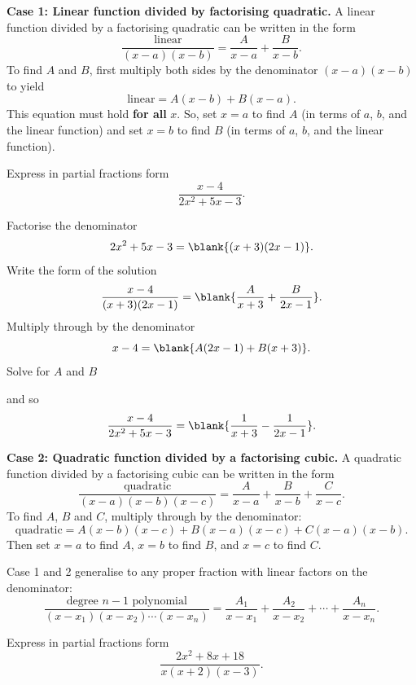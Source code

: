 \textbf{Case 1: Linear function divided by factorising quadratic.} A linear function divided by a factorising quadratic can be written in the form
\[
\frac{\text{linear}}{(x-a)(x-b)}=\frac{A}{x-a}+\frac{B}{x-b}.
\]
To find $A$ and $B$, first multiply both sides by the denominator $(x-a)(x-b)$ to yield
\[
\text{linear}=A(x-b)+B(x-a).
\]
This equation must hold \textbf{for all} $x$. So, set $x=a$ to find $A$ (in terms of $a$, $b$, and the linear function) and set $x=b$ to find $B$ (in terms of $a$, $b$, and the linear function).

\begin{example}[Lecture]
Express in partial fractions form
\[
\frac{x-4}{2x^2+5x-3}.
\]
\end{example}

\begin{solution}
Factorise the denominator
\[
2x^2+5x-3=\blank{(x+3)(2x-1)}.
\]
Write the form of the solution
\[
\frac{x-4}{(x+3)(2x-1)}=\blank{\frac{A}{x+3}+\frac{B}{2x-1}}.
\]
Multiply through by the denominator
\[
x-4=\blank{A(2x-1)+B(x+3)}.
\]
Solve for $A$ and $B$\par
{}\par
{}\par
and so
\[
\frac{x-4}{2x^2+5x-3}=\blank{\frac{1}{x+3}-\frac{1}{2x-1}}.
\]
\end{solution}

\textbf{Case 2: Quadratic function divided by a factorising cubic.} A quadratic function divided by a factorising cubic can be written in the form
\[
\frac{\text{quadratic}}{(x-a)(x-b)(x-c)}=\frac{A}{x-a}+\frac{B}{x-b}+\frac{C}{x-c}.
\]
To find $A$, $B$ and $C$, multiply through by the denominator:
\[
\text{quadratic}=A(x-b)(x-c)+B(x-a)(x-c)+C(x-a)(x-b).
\]
Then set $x=a$ to find $A$, $x=b$ to find $B$, and $x=c$ to find $C$.

Case 1 and 2 generalise to any proper fraction with linear factors on the denominator:
\[
\frac{\text{degree }n-1\text{ polynomial}}{(x-x_1)(x-x_2)\cdots(x-x_n)}
=
\frac{A_1}{x-x_1}+\frac{A_2}{x-x_2}+\cdots+\frac{A_n}{x-x_n}.
\]

\begin{example}[Video]
Express in partial fractions form
\[
\frac{2x^2+8x+18}{x(x+2)(x-3)}.
\]
\end{example}

